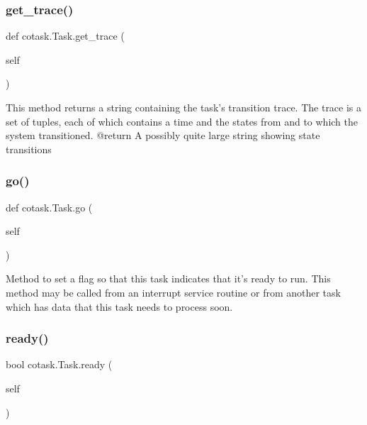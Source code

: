 \subsubsection{\texorpdfstring{get\_trace()}{get\_trace()}}
{\footnotesize\ttfamily def cotask.\+Task.\+get\+\_\+trace (\begin{DoxyParamCaption}\item[{}]{self }\end{DoxyParamCaption})}

\begin{DoxyVerb}This method returns a string containing the task's transition 
trace. The trace is a set of tuples, each of which contains a time 
and the states from and to which the system transitioned. 
@return A possibly quite large string showing state transitions \end{DoxyVerb}
 \mbox{\label{classcotask_1_1_task_a78e74d18a5ba94074c2b5309394409a5}} 
\subsubsection{\texorpdfstring{go()}{go()}}
{\footnotesize\ttfamily def cotask.\+Task.\+go (\begin{DoxyParamCaption}\item[{}]{self }\end{DoxyParamCaption})}

\begin{DoxyVerb}Method to set a flag so that this task indicates that it's 
ready to run. This method may be called from an interrupt service 
routine or from another task which has data that this task needs to 
process soon. \end{DoxyVerb}
 \mbox{\label{classcotask_1_1_task_a6102bc35d7cb1ce292abc85d4ddc23e1}} 
\subsubsection{\texorpdfstring{ready()}{ready()}}
{\footnotesize\ttfamily  bool cotask.\+Task.\+ready (\begin{DoxyParamCaption}\item[{}]{self }\end{DoxyParamCaption})}

